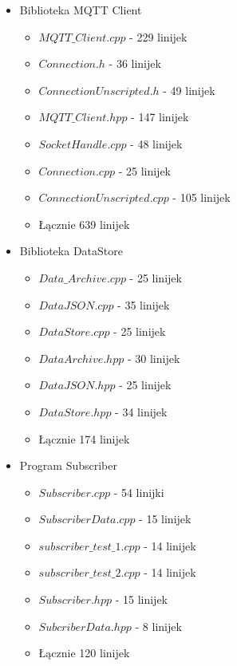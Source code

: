 \documentclass[a4paper,titlepage,11pt,twosides,floatssmall]{mwrep}
\begin{document}
\begin{itemize}
	\item Biblioteka MQTT Client
\begin{itemize}

\item $MQTT\_Client.cpp$ - 229 linijek 
\item $Connection.h$ - 36 linijek 
\item $ConnectionUnscripted.h$ - 49 linijek 
\item $MQTT\_Client.hpp$ - 147 linijek 
\item $SocketHandle.cpp$ - 48 linijek
\item $Connection.cpp$ - 25 linijek 
\item $ConnectionUnscripted.cpp$ - 105 linijek 
\item Łącznie 639 linijek
\end{itemize}

	\item Biblioteka DataStore
\begin{itemize}
\item $Data\_Archive.cpp$ - 25 linijek
\item $DataJSON.cpp$ - 35 linijek 
\item $DataStore.cpp$ - 25 linijek 
\item $DataArchive.hpp$ - 30 linijek 
\item $DataJSON.hpp$ - 25 linijek 
\item $DataStore.hpp$ - 34 linijek 
\item Łącznie 174 linijek
\end{itemize}

	\item Program Subscriber

\begin{itemize}
\item $Subscriber.cpp$ - 54 linijki
\item $SubscriberData.cpp$ - 15 linijek
\item $subscriber\_test\_1.cpp$ - 14 linijek 
\item $subscriber\_test\_2.cpp$ - 14 linijek 
\item $Subscriber.hpp$ - 15 linijek 
\item $SubcriberData.hpp$ - 8 linijek 
\item Łącznie 120 linijek
\end{itemize}


\end{itemize}
\end{document}
